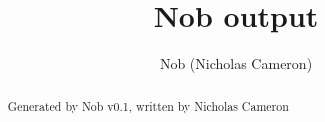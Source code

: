 \documentclass{article}
\begin{document}
\title{Nob output}
\author{Nob (Nicholas Cameron)}

\maketitle


\begin{abstract}
Generated by Nob v0.1, written by Nicholas Cameron
\end{abstract}
\end{document}
